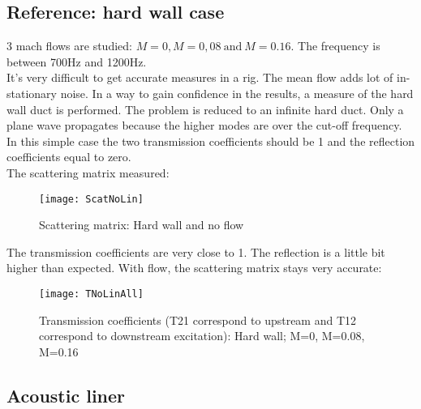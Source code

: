 \subsection{Reference: hard wall case}
3 mach flows are studied: $M=0, M=0,08\ \text{and}\ M=0.16$. The frequency is between 700Hz and 1200Hz.\\
It's very difficult to get accurate measures in a rig. The mean flow adds lot of in-stationary noise. In a way to gain confidence in the results, a measure of the hard wall duct is performed. The problem is reduced to an infinite hard duct. Only a plane wave propagates because the higher modes are over the cut-off frequency. In this simple case the two transmission coefficients should be 1 and the reflection coefficients equal to zero.\\
The scattering matrix measured:
\begin{figure}[H] \centering
    \texttt{[image: ScatNoLin]}
    \caption{Scattering matrix: Hard wall and no flow }
\end{figure}
\noindent The transmission coefficients are very close to 1. The reflection is a little bit higher than expected. With flow, the scattering matrix stays very accurate:
\begin{figure}[H] \centering
    \texttt{[image: TNoLinAll]}
    \caption{Transmission coefficients (T21 correspond to upstream and  T12 correspond to downstream excitation): Hard wall; M=0, M=0.08, M=0.16 }
\end{figure}
\subsection{Acoustic liner}
